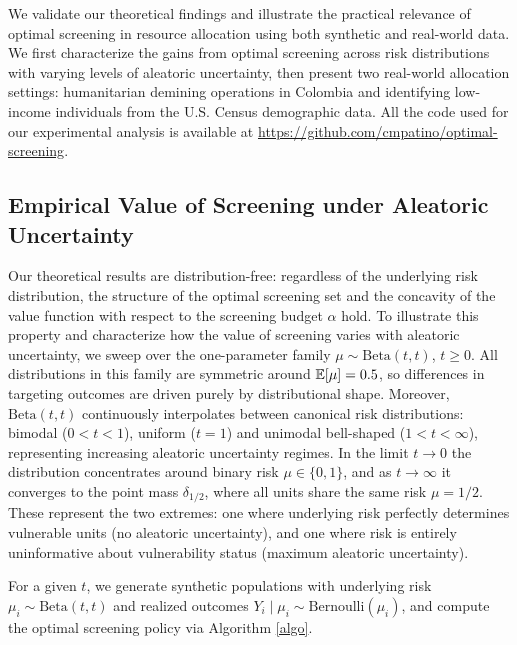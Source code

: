 We validate our theoretical findings and illustrate the practical relevance of optimal screening in resource allocation using both synthetic and real-world data. We first characterize the gains from optimal screening across risk distributions with varying levels of aleatoric uncertainty, then present two real-world allocation settings: humanitarian demining operations in Colombia and identifying low-income individuals from the U.S. Census demographic data. All the code used for our experimental analysis is available at  \url{https://github.com/cmpatino/optimal-screening}.


\subsection{Empirical Value of Screening under Aleatoric Uncertainty}

Our theoretical results are distribution-free: regardless of the underlying risk distribution, the structure of the optimal screening set and the concavity of the value function with respect to the screening budget $\alpha$ hold. To illustrate this property and characterize how the value of screening varies with aleatoric uncertainty, we sweep over the one-parameter family $\mu \sim \text{Beta}(t,t)$, $t\geq 0$. All distributions in this family are symmetric around $\mathbb{E}[\mu]= 0.5$, so differences in targeting outcomes are driven purely by distributional shape. Moreover, $\text{Beta}(t,t)$ continuously interpolates between canonical risk distributions: bimodal ($0 < t < 1$), uniform ($t=1$) and unimodal bell-shaped ($1 < t < \infty$), representing increasing aleatoric uncertainty regimes. In the limit $t \to 0$ the distribution concentrates around binary risk $\mu \in \{0, 1\}$, and as $t \to \infty$ it converges to the point mass $\delta_{1/2}$, where all units share the same risk $\mu = 1/2$. These represent the two extremes: one where underlying risk perfectly determines vulnerable units (no aleatoric uncertainty), and one where risk is entirely uninformative about vulnerability status (maximum aleatoric uncertainty). 

For a given $t$, we generate synthetic populations with underlying risk $\mu_i \sim \text{Beta}(t,t)$ and realized outcomes $Y_i \mid \mu_i \sim \text{Bernoulli}(\mu_i)$, and compute the optimal screening policy via Algorithm \ref{algo}. 

